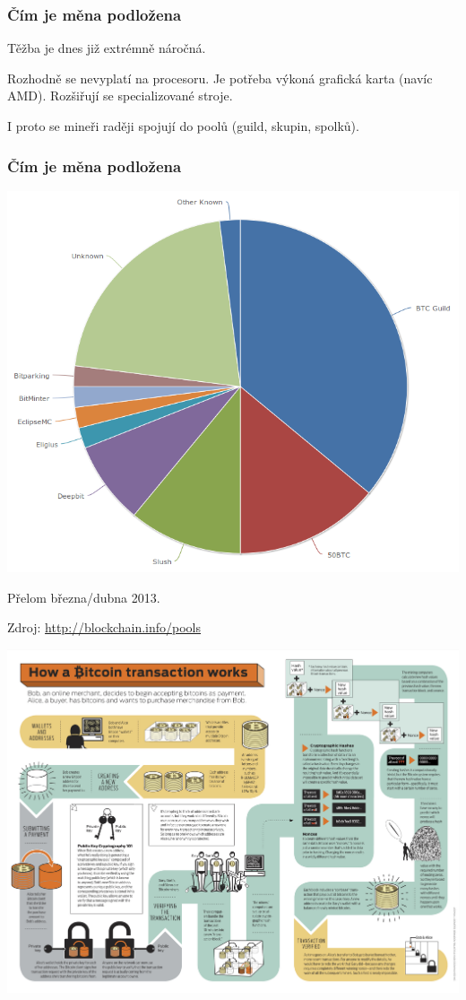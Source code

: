 \documentclass[xetex]{beamer}
\begin{document}
\begin{frame}
	\frametitle{Čím je měna podložena}
	Těžba je dnes již extrémně náročná. 

	\bigskip

	Rozhodně se nevyplatí na procesoru. Je potřeba výkoná grafická karta (navíc AMD). Rozšiřují se specializované stroje.

	\bigskip 

	I proto se mineři raději spojují do poolů (guild, skupin, spolků).
\end{frame}

\begin{frame}
	\frametitle{Čím je měna podložena}
	
	\includegraphics[scale=0.25]{images/bitcoin-pools.png}

	Přelom března/dubna 2013.

	Zdroj: \url{http://blockchain.info/pools}
\end{frame}


\begin{frame}
	\includegraphics[scale=0.37]{images/how-a-bitcoin-transaction-works.jpg}
\end{frame}
\end{document}
